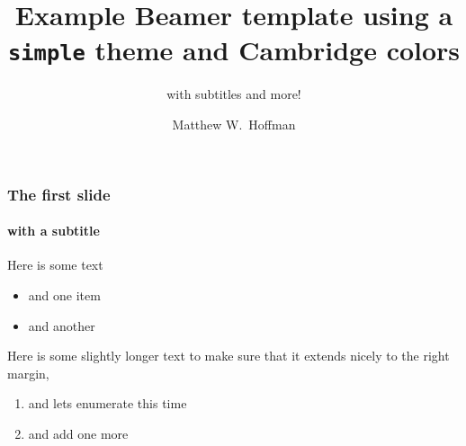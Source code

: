 \documentclass[t]{beamer}
\title{Example Beamer template using a \texttt{simple} theme and Cambridge
colors}
\subtitle{with subtitles and more!}
\author{Matthew W.~Hoffman}
\institute{University of Cambridge}
\begin{document}
\maketitle

\begin{frame}
    \frametitle{The first slide}
    \framesubtitle{with a subtitle}

    Here is some text
    \begin{itemize}
        \item and one item
        \item and another
    \end{itemize}

    \vspace{1em}
    Here is some slightly longer text to make sure that it extends nicely to 
    the right margin,
    \begin{enumerate}
        \item and lets enumerate this time
        \item and add one more
    \end{enumerate}
\end{frame}

\end{document}
